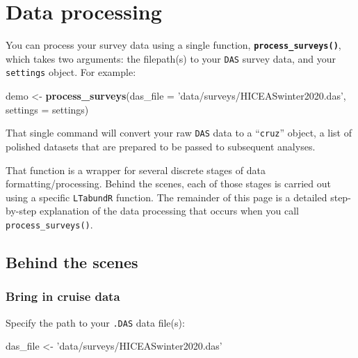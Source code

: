 \documentclass[
]{book}
\newenvironment{Shaded}{\begin{snugshade}}{\end{snugshade}}
\newcommand{\DataTypeTok}[1]{\textcolor[rgb]{0.13,0.29,0.53}{#1}}
\newcommand{\KeywordTok}[1]{\textcolor[rgb]{0.13,0.29,0.53}{\textbf{#1}}}
\newcommand{\NormalTok}[1]{#1}
\newcommand{\StringTok}[1]{\textcolor[rgb]{0.31,0.60,0.02}{#1}}
\begin{document}
\hypertarget{processing}{%
\chapter{Data processing}\label{processing}}

You can process your survey data using a single function, \textbf{\texttt{process\_surveys()}}, which takes two arguments: the filepath(s) to your \texttt{DAS} survey data, and your \texttt{settings} object. For example:

\begin{Shaded}
\begin{Highlighting}[]
\NormalTok{demo <-}\StringTok{ }\KeywordTok{process_surveys}\NormalTok{(}\DataTypeTok{das_file =} \StringTok{'data/surveys/HICEASwinter2020.das'}\NormalTok{,}
                \DataTypeTok{settings =}\NormalTok{ settings)}
\end{Highlighting}
\end{Shaded}

That single command will convert your raw \texttt{DAS} data to a ``\texttt{cruz}'' object, a list of polished datasets that are prepared to be passed to subsequent analyses.

That function is a wrapper for several discrete stages of data formatting/processing. Behind the scenes, each of those stages is carried out using a specific \texttt{LTabundR} function. The remainder of this page is a detailed step-by-step explanation of the data processing that occurs when you call \texttt{process\_surveys()}.

\hypertarget{behind-the-scenes}{%
\section*{Behind the scenes}\label{behind-the-scenes}}

\hypertarget{bring-in-cruise-data}{%
\subsection*{Bring in cruise data}\label{bring-in-cruise-data}}

Specify the path to your \texttt{.DAS} data file(s):

\begin{Shaded}
\begin{Highlighting}[]
\NormalTok{das_file <-}\StringTok{ 'data/surveys/HICEASwinter2020.das'}
\end{Highlighting}
\end{Shaded}
\end{document}
